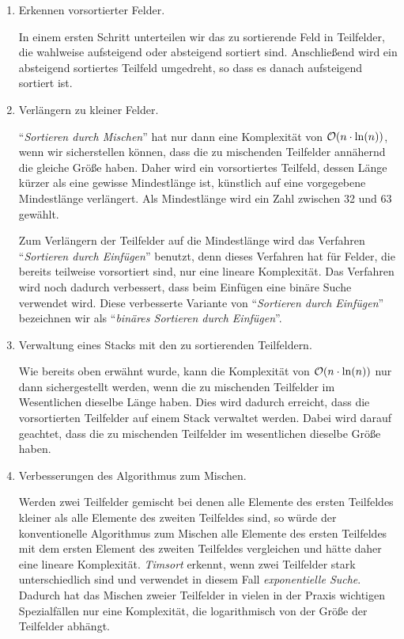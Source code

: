 \begin{enumerate}
\item Erkennen vorsortierter Felder.

      In einem ersten Schritt unterteilen wir das zu sortierende Feld in Teilfelder, 
      die wahlweise aufsteigend oder absteigend sortiert sind.  Anschlie{\ss}end wird ein absteigend
      sortiertes Teilfeld umgedreht, so dass es danach aufsteigend sortiert ist.
\item Verl\"angern zu kleiner Felder.

      ``\emph{Sortieren durch Mischen}'' hat nur dann eine Komplexit\"at von $\mathcal{O}(n \cdot \ln(n))$, wenn
      wir sicherstellen k\"onnen, dass die zu mischenden Teilfelder ann\"ahernd die gleiche Gr\"o{\ss}e haben.
      Daher wird ein vorsortiertes Teilfeld, dessen L\"ange k\"urzer als eine gewisse Mindestl\"ange 
      ist, k\"unstlich auf eine vorgegebene Mindestl\"ange verl\"angert.  Als Mindestl\"ange wird ein Zahl zwischen
      32 und 63 gew\"ahlt. 

      Zum Verl\"angern der Teilfelder auf die Mindestl\"ange wird das Verfahren 
      ``\emph{Sortieren durch Einf\"ugen}'' benutzt, denn dieses Verfahren hat f\"ur Felder, die bereits
      teilweise vorsortiert sind, nur eine lineare Komplexit\"at.  Das Verfahren wird noch dadurch
      verbessert, dass beim Einf\"ugen eine bin\"are Suche verwendet wird.  Diese verbesserte Variante
      von ``\emph{Sortieren durch Einf\"ugen}'' bezeichnen wir als 
      ``\emph{bin\"ares Sortieren durch Einf\"ugen}''.
\item Verwaltung eines Stacks mit den zu sortierenden Teilfeldern.

      Wie bereits oben erw\"ahnt wurde, kann die Komplexit\"at von $\mathcal{O}(n \cdot \ln(n))$ nur dann
      sichergestellt werden, wenn die zu mischenden Teilfelder im Wesentlichen dieselbe L\"ange
      haben.  Dies wird dadurch erreicht, dass die vorsortierten Teilfelder auf einem Stack
      verwaltet werden.  Dabei wird darauf geachtet, dass die zu mischenden Teilfelder im
      wesentlichen dieselbe Gr\"o{\ss}e haben.
\item Verbesserungen des Algorithmus zum Mischen.

      Werden zwei Teilfelder gemischt bei denen alle Elemente des ersten Teilfeldes kleiner als alle
      Elemente des zweiten Teilfeldes sind, so w\"urde der konventionelle Algorithmus zum Mischen
      alle Elemente des ersten Teilfeldes mit dem ersten Element des zweiten Teilfeldes vergleichen
      und h\"atte daher eine lineare Komplexit\"at.  \emph{Timsort} erkennt, wenn zwei Teilfelder stark
      unterschiedlich sind und verwendet in diesem Fall \emph{exponentielle Suche}.  Dadurch hat 
      das Mischen zweier Teilfelder in vielen in der Praxis wichtigen Spezialf\"allen nur eine
      Komplexit\"at, die logarithmisch von der Gr\"o{\ss}e der Teilfelder abh\"angt.
\end{enumerate}
